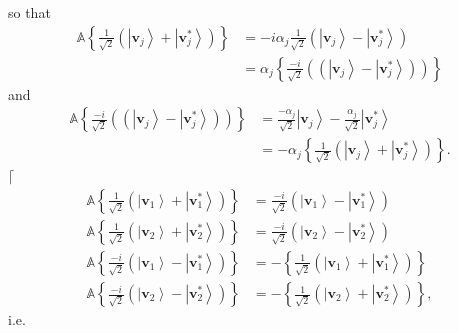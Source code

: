 \documentclass[aps,preprint]{revtex4}%
\begin{document}
so that
\begin{align}
\mathbb{A}\left\{  \frac{1}{\sqrt{2}}\left(  \left\vert \mathbf{v}%
_{j}\right\rangle +\left\vert \mathbf{v}_{j}^{\ast}\right\rangle \right)
\right\}   &  =-i\alpha_{j}\frac{1}{\sqrt{2}}\left(  \left\vert \mathbf{v}%
_{j}\right\rangle -\left\vert \mathbf{v}_{j}^{\ast}\right\rangle \right)
\nonumber\\
&  =\alpha_{j}\left\{  \frac{-i}{\sqrt{2}}\left(  \left(  \left\vert
\mathbf{v}_{j}\right\rangle -\left\vert \mathbf{v}_{j}^{\ast}\right\rangle
\right)  \right)  \right\}
\end{align}
and
\begin{align}
\mathbb{A}\left\{  \frac{-i}{\sqrt{2}}\left(  \left(  \left\vert
\mathbf{v}_{j}\right\rangle -\left\vert \mathbf{v}_{j}^{\ast}\right\rangle
\right)  \right)  \right\}   &  =\frac{-\alpha_{j}}{\sqrt{2}}\left\vert
\mathbf{v}_{j}\right\rangle -\frac{\alpha_{j}}{\sqrt{2}}\left\vert
\mathbf{v}_{j}^{\ast}\right\rangle \nonumber\\
&  =-\alpha_{j}\left\{  \frac{1}{\sqrt{2}}\left(  \left\vert \mathbf{v}%
_{j}\right\rangle +\left\vert \mathbf{v}_{j}^{\ast}\right\rangle \right)
\right\}  .
\end{align}
$\lceil$%
\begin{align}
\mathbb{A}\left\{  \frac{1}{\sqrt{2}}\left(  \left\vert \mathbf{v}%
_{1}\right\rangle +\left\vert \mathbf{v}_{1}^{\ast}\right\rangle \right)
\right\}   &  =\frac{-i}{\sqrt{2}}\left(  \left\vert \mathbf{v}_{1}%
\right\rangle -\left\vert \mathbf{v}_{1}^{\ast}\right\rangle \right)
\nonumber\\
\mathbb{A}\left\{  \frac{1}{\sqrt{2}}\left(  \left\vert \mathbf{v}%
_{2}\right\rangle +\left\vert \mathbf{v}_{2}^{\ast}\right\rangle \right)
\right\}   &  =\frac{-i}{\sqrt{2}}\left(  \left\vert \mathbf{v}_{2}%
\right\rangle -\left\vert \mathbf{v}_{2}^{\ast}\right\rangle \right) \\
\mathbb{A}\left\{  \frac{-i}{\sqrt{2}}\left(  \left\vert \mathbf{v}%
_{1}\right\rangle -\left\vert \mathbf{v}_{1}^{\ast}\right\rangle \right)
\right\}   &  =-\left\{  \frac{1}{\sqrt{2}}\left(  \left\vert \mathbf{v}%
_{1}\right\rangle +\left\vert \mathbf{v}_{1}^{\ast}\right\rangle \right)
\right\} \\
\mathbb{A}\left\{  \frac{-i}{\sqrt{2}}\left(  \left\vert \mathbf{v}%
_{2}\right\rangle -\left\vert \mathbf{v}_{2}^{\ast}\right\rangle \right)
\right\}   &  =-\left\{  \frac{1}{\sqrt{2}}\left(  \left\vert \mathbf{v}%
_{2}\right\rangle +\left\vert \mathbf{v}_{2}^{\ast}\right\rangle \right)
\right\}  ,
\end{align}
i.e.%
\end{document}
